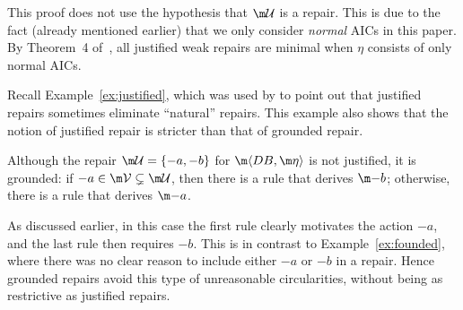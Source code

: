
This proof does not use the hypothesis that $\UU$ is a repair.
This is due to the fact (already mentioned earlier) that we only consider \emph{normal} AICs in this paper. By Theorem~4 of~\cite{tplp/CaropreseT11}, all justified weak repairs are minimal when $\eta$ consists of only normal AICs.


Recall Example~\ref{ex:justified}, which was used by \citet{tase/Cruz-FilipeEGN13} to point out that justified repairs sometimes eliminate ``natural'' repairs.
This example also shows that the notion of justified repair is stricter than that of grounded repair.
\begin{example}[Example~\ref{ex:justified} continued]
  Although the repair $\UU=\{-a,-b\}$ for $\fulldb$ is not justified, it is grounded: if ${-a}\in\VV\subsetneq\UU$, then there is a rule that derives $\remove b$; otherwise, there is a rule that derives $\remove a$. %
\end{example}
As discussed earlier, in this case the first rule clearly motivates the action $-a$, and the last rule then requires $-b$.
This is in contrast to Example~\ref{ex:founded}, where there was no clear reason to include either $-a$ or $-b$ in a repair.
Hence grounded repairs avoid this type of unreasonable circularities, without being as restrictive as justified repairs.

